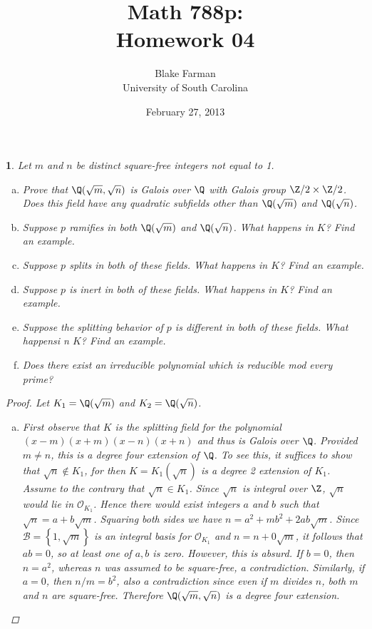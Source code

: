 \documentclass[10pt]{amsart}
\author{Blake Farman\\University of South Carolina}
\title{Math 788p:\\Homework 04}
\date{February 27, 2013}
\begin{document}
\maketitle

\providecommand{\p}{\mathfrak{p}}
\providecommand{\m}{\mathfrak{m}}
\newcommand{\legendre}[2]{\left(\frac{#1}{#2}\right)}
\theoremstyle{plain}
\newtheorem{thm}{}
\newtheorem{lem}{Lemma}
\theoremstyle{definition}
\newtheorem{defn}{Definition}

\setcounter{thm}{7}

\begin{thm}
  Let $m$ and $n$ be distinct square-free integers not equal to 1.
  
  \begin{enumerate}[(a)]
  \item
    Prove that $\Q(\sqrt{m}, \sqrt{n})$ is Galois over $\Q$ with Galois group $\Z/2 \times \Z/2$.
    Does this field have any quadratic subfields other than $\Q(\sqrt{m})$ and $\Q(\sqrt{n})$.
  \item
    Suppose $p$ ramifies in both $\Q(\sqrt{m})$ and $\Q(\sqrt{n})$.
    What happens in $K$?
    Find an example.
  \item
    Suppose $p$ splits in both of these fields.
    What happens in $K$?
    Find an example.
  \item
    Suppose $p$ is inert in both of these fields.
    What happens in $K$?
    Find an example.
  \item
    Suppose the splitting behavior of $p$ is different in both of these fields.
    What happensi n $K$?
    Find an example.
  \item
    Does there exist an irreducible polynomial which is reducible mod every prime?
  \end{enumerate}
  
  \begin{proof}
    Let $K_1 = \Q(\sqrt{m})$ and $K_2 = \Q(\sqrt{n})$.
    \begin{enumerate}[(a)]
      \item
        First observe that $K$ is the splitting field for the polynomial $(x - m)(x + m)(x - n)(x + n)$ and thus is Galois over $\Q$.
        Provided $m \neq n$, this is a degree four extension of $\Q$.
        To see this, it suffices to show that $\sqrt{n} \not \in K_1$, for then $K = K_1(\sqrt{n})$ is a degree 2 extension of $K_1$.
        Assume to the contrary that $\sqrt{n} \in K_1$.
        Since $\sqrt{n}$ is integral over $\Z$, $\sqrt{n}$ would lie in $\mathcal{O}_{K_1}$.
        Hence there would exist integers $a$ and $b$ such that $\sqrt{n} = a + b\sqrt{m}$.
        Squaring both sides we have $n = a^2 + mb^2 + 2ab\sqrt{m}$.
        Since $\mathcal{B} = \left\{1, \sqrt{m}\right\}$ is an integral basis for $\mathcal{O}_{K_1}$ and $n = n + 0\sqrt{m}$, it follows that $ab = 0$, so at least one of $a,b$ is zero.
        However, this is absurd.
        If $b = 0$, then $n = a^2$, whereas $n$ was assumed to be square-free, a contradiction.
        Similarly, if $a = 0$, then $n/m = b^2$, also a contradiction since even if $m$ divides $n$, both $m$ and $n$ are square-free.
        Therefore $\Q(\sqrt{m}, \sqrt{n})$ is a degree four extension.
        

\end{enumerate}
\end{proof}
\end{thm}
\end{document}
